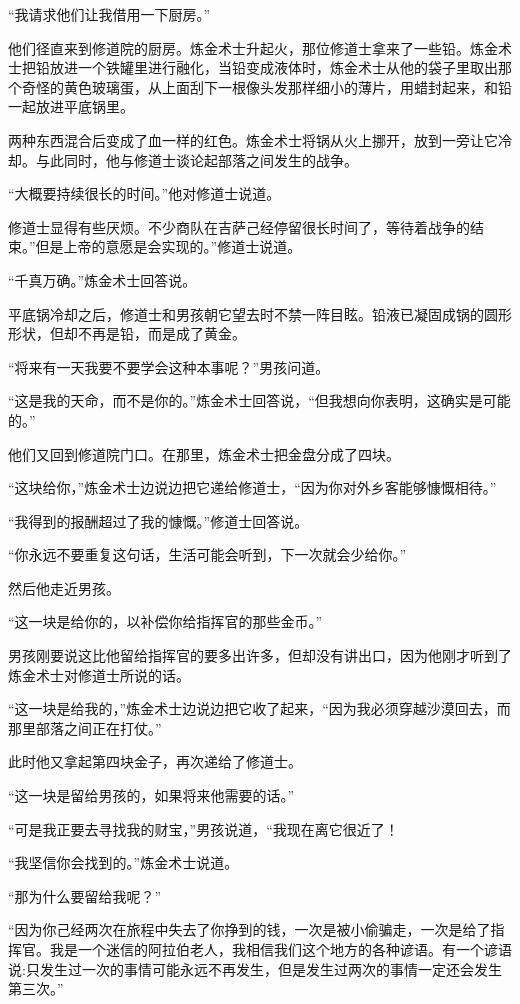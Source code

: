 \documentclass[twoside,openany]{book}
\begin{document}
“我请求他们让我借用一下厨房。”

他们径直来到修道院的厨房。炼金术士升起火，那位修道士拿来了一些铅。炼金术士把铅放进一个铁罐里进行融化，当铅变成液体时，炼金术士从他的袋子里取出那个奇怪的黄色玻璃蛋，从上面刮下一根像头发那样细小的薄片，用蜡封起来，和铅一起放进平底锅里。

两种东西混合后变成了血一样的红色。炼金术士将锅从火上挪开，放到一旁让它冷却。与此同时，他与修道士谈论起部落之间发生的战争。

“大概要持续很长的时间。”他对修道士说道。

修道士显得有些厌烦。不少商队在吉萨己经停留很长时间了，等待着战争的结束。”但是上帝的意愿是会实现的。”修道士说道。

“千真万确。”炼金术士回答说。

平底锅冷却之后，修道士和男孩朝它望去时不禁一阵目眩。铅液已凝固成锅的圆形形状，但却不再是铅，而是成了黄金。

“将来有一天我要不要学会这种本事呢？”男孩问道。

“这是我的天命，而不是你的。”炼金术士回答说，“但我想向你表明，这确实是可能的。”

他们又回到修道院门口。在那里，炼金术士把金盘分成了四块。

“这块给你，”炼金术士边说边把它递给修道士，“因为你对外乡客能够慷慨相待。”

“我得到的报酬超过了我的慷慨。”修道士回答说。

“你永远不要重复这句话，生活可能会听到，下一次就会少给你。”

然后他走近男孩。

“这一块是给你的，以补偿你给指挥官的那些金币。”

男孩刚要说这比他留给指挥官的要多出许多，但却没有讲出口，因为他刚才听到了炼金术士对修道士所说的话。

“这一块是给我的，”炼金术士边说边把它收了起来，“因为我必须穿越沙漠回去，而那里部落之间正在打仗。”

此时他又拿起第四块金子，再次递给了修道士。

“这一块是留给男孩的，如果将来他需要的话。”

“可是我正要去寻找我的财宝，”男孩说道，“我现在离它很近了！

“我坚信你会找到的。”炼金术士说道。

“那为什么要留给我呢？”

“因为你己经两次在旅程中失去了你挣到的钱，一次是被小偷骗走，一次是给了指挥官。我是一个迷信的阿拉伯老人，我相信我们这个地方的各种谚语。有一个谚语说:只发生过一次的事情可能永远不再发生，但是发生过两次的事情一定还会发生第三次。”
\end{document}
